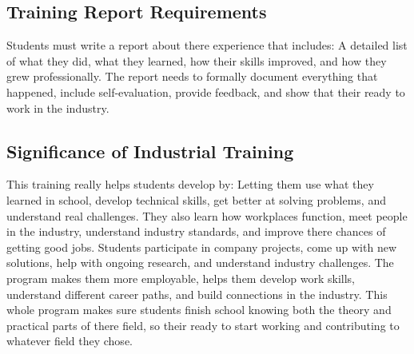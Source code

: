 \subsection{Training Report Requirements}
Students must write a report about there experience that includes:
A detailed list of what they did, what they learned, how their skills improved, and how they grew professionally. The report needs to formally document everything that happened, include self-evaluation, provide feedback, and show that their ready to work in the industry.
\subsection{Significance of Industrial Training}
This training really helps students develop by:
Letting them use what they learned in school, develop technical skills, get better at solving problems, and understand real challenges. They also learn how workplaces function, meet people in the industry, understand industry standards, and improve there chances of getting good jobs. Students participate in company projects, come up with new solutions, help with ongoing research, and understand industry challenges. The program makes them more employable, helps them develop work skills, understand different career paths, and build connections in the industry.
This whole program makes sure students finish school knowing both the theory and practical parts of there field, so their ready to start working and contributing to whatever field they chose.